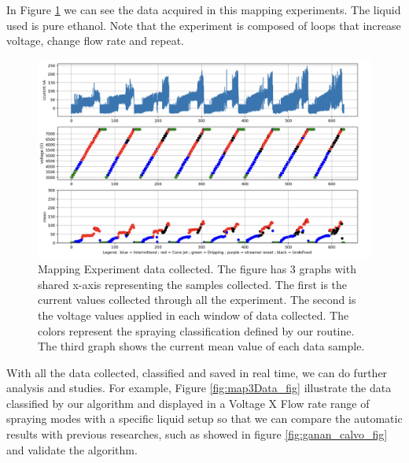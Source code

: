     In Figure \ref{fig:map2Data_fig} we can see the data acquired in this mapping experiments. The liquid used is pure ethanol. 
    Note that the experiment is composed of loops that increase voltage, change flow rate and repeat.

    \begin{figure}[H]
        \center
        \includegraphics[width=15cm]{Figuras/report2/map2Data.png}
        \caption{Mapping Experiment data collected. The figure has 3 graphs with shared x-axis representing the samples collected. The first is the current values collected through all the experiment.
        The second is the voltage values applied in each window of data collected. The colors represent the spraying classification defined by our routine.
        The third graph shows the current mean value of each data sample.}
        \label{fig:map2Data_fig}
    \end{figure}

    With all the data collected, classified and saved in real time, we can do further analysis and studies. For example, Figure \ref{fig:map3Data_fig} illustrate the data classified by our algorithm and displayed in a Voltage X Flow rate range of spraying modes with a specific liquid setup so that we can compare the automatic results with previous researches, such as showed in figure \ref{fig:ganan_calvo_fig} and validate the algorithm.


